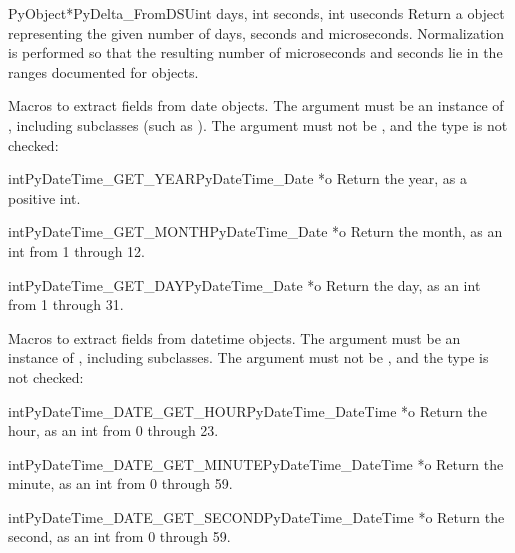 \begin{cfuncdesc}{PyObject*}{PyDelta_FromDSU}{int days, int seconds,
        int useconds}
  Return a  object representing the given number
  of days, seconds and microseconds.  Normalization is performed so that
  the resulting number of microseconds and seconds lie in the ranges
  documented for  objects.
\end{cfuncdesc}

Macros to extract fields from date objects.  The argument must be an
instance of , including subclasses (such as
).  The argument must not be \NULL{}, and
the type is not checked:

\begin{cfuncdesc}{int}{PyDateTime_GET_YEAR}{PyDateTime_Date *o}
  Return the year, as a positive int.
\end{cfuncdesc}

\begin{cfuncdesc}{int}{PyDateTime_GET_MONTH}{PyDateTime_Date *o}
  Return the month, as an int from 1 through 12.
\end{cfuncdesc}

\begin{cfuncdesc}{int}{PyDateTime_GET_DAY}{PyDateTime_Date *o}
  Return the day, as an int from 1 through 31.
\end{cfuncdesc}

Macros to extract fields from datetime objects.  The argument must be an
instance of , including subclasses.
The argument must not be \NULL{}, and the type is not checked:

\begin{cfuncdesc}{int}{PyDateTime_DATE_GET_HOUR}{PyDateTime_DateTime *o}
  Return the hour, as an int from 0 through 23.
\end{cfuncdesc}

\begin{cfuncdesc}{int}{PyDateTime_DATE_GET_MINUTE}{PyDateTime_DateTime *o}
  Return the minute, as an int from 0 through 59.
\end{cfuncdesc}

\begin{cfuncdesc}{int}{PyDateTime_DATE_GET_SECOND}{PyDateTime_DateTime *o}
  Return the second, as an int from 0 through 59.
\end{cfuncdesc}

